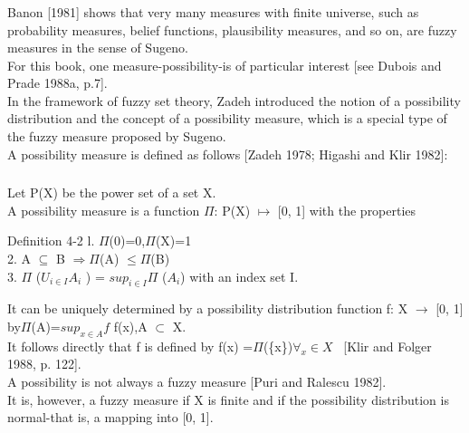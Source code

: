 \documentclass{beamer}
\begin{document}
\begin{CJK*}{UTF8}{bsmi}

\begin{frame}
\frametitle{}
Banon [1981] shows that very many measures with finite universe, such as probability measures, belief functions, plausibility measures, and so on, are fuzzy measures in the sense of Sugeno. \\
For this book, one measure-possibility-is of particular interest [see Dubois and Prade 1988a, p.7].\\
In the framework of fuzzy set theory, Zadeh introduced the notion of a possibility distribution and the concept of a possibility measure, which is a special type of the fuzzy measure proposed by Sugeno. \\
A possibility measure is defined as follows [Zadeh 1978; Higashi and Klir 1982]:

\end{frame}


\begin{frame}
\frametitle{}
Let P(X) be the power set of a set X.\\
A possibility measure is a function $ \Pi $: P(X) $ \mapsto $ [0, 1] with the properties\\
\begin{block}{Definition 4-2}
l. $ \Pi $(0)=0,$ \Pi $(X)=1\\
2. A $ \subseteq $ B $ \Rightarrow  \Pi   $(A) $\leq \Pi $(B)\\
3. $\Pi$ ($U_{i \in I}A_{i}$ ) = $sup_{i\in I} \Pi$ ($A_{i}$) with an index set I.
~\\
\end{block}
It can be uniquely determined by a possibility distribution function f: X $ \rightarrow $ [0, 1] by$\Pi$(A)=$sup_{x \in A}f$ f(x),A $\subset$ X.\\
It follows directly that f is defined by f(x) =$\Pi$(\{x\})$\forall_x \in X$ ~[Klir and Folger 1988, p. 122].\\
A possibility is not always a fuzzy measure [Puri and Ralescu 1982].\\
It is, however, a fuzzy measure if X is finite and if the possibility distribution is normal-that is, a mapping into [0, 1].
\end{frame}



\end{CJK*}
\end{document}
